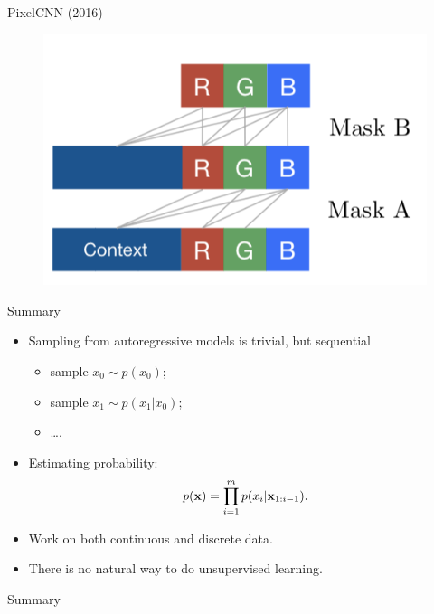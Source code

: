 \begin{frame}{PixelCNN (2016)}
\begin{minipage}[t]{0.5\columnwidth}
\begin{figure}[h]
	\end{figure}
	\vspace{-0.4cm}
	\begin{figure}
		\centering
        \includegraphics[width=0.65\linewidth]{figs/pixelcnn2.png}
	\end{figure}
\end{minipage}
\end{frame}
\begin{frame}{Summary}
    \begin{itemize}
        \item Sampling from autoregressive models is trivial, but sequential
        \begin{itemize}
            \item sample $x_0 \sim p(x_0)$;
            \item sample $x_1 \sim p(x_1 | x_0)$;
            \item \dots.
        \end{itemize}
        \item Estimating probability:
        \[
            p(\mathbf{x}) = \prod_{i=1}^m p(x_i | \mathbf{x}_{1:i - 1}).
        \]
        \item Work on both continuous and discrete data.
        \item There is no natural way to do unsupervised learning.
    \end{itemize}
\end{frame}
\begin{frame}{Summary}
\end{frame}

 